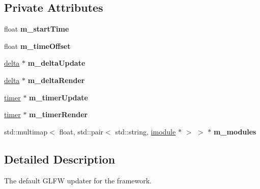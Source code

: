 \subsection*{Private Attributes}
\begin{DoxyCompactItemize}
\item 
\mbox{\label{classflounder_1_1glfwupdater_a318ba9d32a7b08e4a85c4a26ce461da4}} 
float {\bfseries m\+\_\+start\+Time}
\item 
\mbox{\label{classflounder_1_1glfwupdater_a5ba86d2b6c5a63096a48e922b8af42ae}} 
float {\bfseries m\+\_\+time\+Offset}
\item 
\mbox{\label{classflounder_1_1glfwupdater_ab9cbfc326d5541b950cd1bb2b4e777ee}} 
\hyperlink{classflounder_1_1delta}{delta} $\ast$ {\bfseries m\+\_\+delta\+Update}
\item 
\mbox{\label{classflounder_1_1glfwupdater_a77590ce7ebb3f3aa8b69e95e2ae98fb4}} 
\hyperlink{classflounder_1_1delta}{delta} $\ast$ {\bfseries m\+\_\+delta\+Render}
\item 
\mbox{\label{classflounder_1_1glfwupdater_ab00958332ab500ed7e52bd74ae01c2c9}} 
\hyperlink{classflounder_1_1timer}{timer} $\ast$ {\bfseries m\+\_\+timer\+Update}
\item 
\mbox{\label{classflounder_1_1glfwupdater_ac3dae6d2a82d58c796a2c095a928e897}} 
\hyperlink{classflounder_1_1timer}{timer} $\ast$ {\bfseries m\+\_\+timer\+Render}
\item 
\mbox{\label{classflounder_1_1glfwupdater_a5c024a8ff10e2dd9ec96e6054e2d7b00}} 
std\+::multimap$<$ float, std\+::pair$<$ std\+::string, \hyperlink{classflounder_1_1imodule}{imodule} $\ast$ $>$ $>$ $\ast$ {\bfseries m\+\_\+modules}
\end{DoxyCompactItemize}


\subsection{Detailed Description}
The default G\+L\+FW updater for the framework. 



